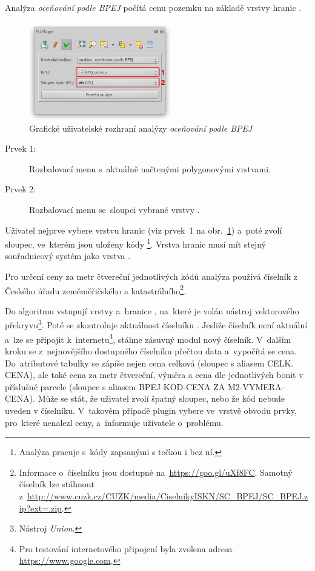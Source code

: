 Analýza \textit{oceňování podle BPEJ} počítá cenu pozemku na základě vrstvy hranic .

	\begin{figure}[H]
		\centering
		\includegraphics[width=0.55\textwidth]{./pictures/analyza_bpej.png}
		\caption[Grafické uživatelské rozhraní analýzy \textit{oceňování podle BPEJ}]{Grafické uživatelské rozhraní analýzy \textit{oceňování podle BPEJ}}
		\label{fig:analyza_bpej_gui}
 	\end{figure}

\begin{description}
	\item[Prvek 1:] Rozbalovací menu s~aktuálně načtenými polygonovými vrstvami.
	\item[Prvek 2:] Rozbalovací menu se~sloupci vybrané vrstvy .
\end{description}

Uživatel nejprve vybere vrstvu hranic  (viz prvek~1 na obr.~\ref{fig:analyza_bpej_gui}) a~poté zvolí sloupec, ve~kterém jsou uloženy kódy \footnote{Analýza pracuje s~kódy zapsanými s tečkou i bez ní.}. Vrstva hranic  musí mít stejný souřadnicový systém jako vrstva .

Pro určení ceny za metr čtvereční jednotlivých kódů  analýza používá číselník  z Českého úřadu zeměměřičského a katastrálního\footnote{Informace o~číselníku jsou dostupné na~\url{https://goo.gl/uXf8FC}. Samotný číselník lze stáhnout z~\url{http://www.cuzk.cz/CUZK/media/CiselnikyISKN/SC_BPEJ/SC_BPEJ.zip?ext=.zip}.}.

Do algoritmu vstupují vrstvy  a~hranice , na~které je volán nástroj vektorového překryvu\footnote{Nástroj \textit{Union}.}. Poté se zkontroluje aktuálnost číselníku . Jesliže číselník není aktuální a~lze se připojit k~internetu\footnote{Pro testování internetového připojení byla zvolena adresa \url{https://www.google.com}.}, stáhne zásuvný modul nový číselník. V~dalším kroku se z~nejnovějšího dostupného číselníku přečtou data a~vypočítá se cena. Do~atributové tabulky se zápíše nejen cena celková (sloupec  s aliasem CELK. CENA), ale také cena za metr čtvereční, výměra a cena dle jednotlivých bonit v příslušné parcele (sloupec  s aliasem BPEJ KOD-CENA ZA M2-VYMERA-CENA). Může se stát, že uživatel zvolí špatný sloupec, nebo že kód  nebude uveden v číselníku. V~takovém případě plugin vybere ve~vrstvě obvodu prvky, pro~které nenalezl ceny, a~informuje uživatele o~problému.

